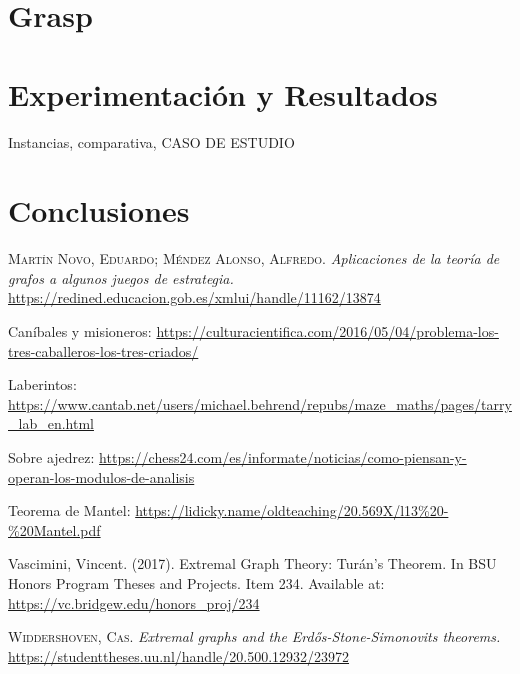 \documentclass[12pt,a4paper]{book}
\begin{document}
\chapter{Grasp}




\chapter{Experimentación y Resultados}

Instancias, comparativa, CASO DE ESTUDIO

\chapter{Conclusiones}





\begin{thebibliography}{X}
     \textsc{Martín Novo, Eduardo; Méndez Alonso, Alfredo}.
    \textit{Aplicaciones de la teoría de grafos a algunos juegos de estrategia.}
    \url{https://redined.educacion.gob.es/xmlui/handle/11162/13874}

     Caníbales y misioneros: \url{https://culturacientifica.com/2016/05/04/problema-los-tres-caballeros-los-tres-criados/}

     Laberintos: \url{https://www.cantab.net/users/michael.behrend/repubs/maze_maths/pages/tarry_lab_en.html}
    
     Sobre ajedrez: \url{https://chess24.com/es/informate/noticias/como-piensan-y-operan-los-modulos-de-analisis}

     Teorema de Mantel: \url{https://lidicky.name/oldteaching/20.569X/l13%20-%20Mantel.pdf}

     Vascimini, Vincent. (2017). Extremal Graph Theory: Turán’s Theorem. 
    In BSU Honors Program Theses and Projects. Item 234. Available at: \url{https://vc.bridgew.edu/honors_proj/234}

     \textsc{Widdershoven, Cas.} \textit{Extremal graphs and the Erd{\H{o}}s-Stone-Simonovits theorems.}
    \url{https://studenttheses.uu.nl/handle/20.500.12932/23972}

\end{thebibliography}
\end{document}
